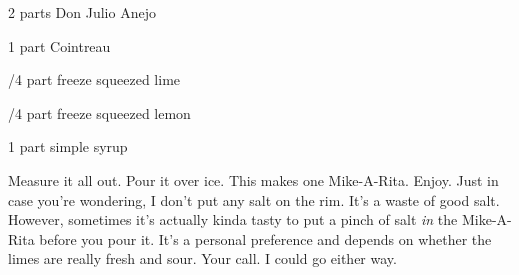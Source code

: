 %
%
%
%
\newpage



\begin{IngredientsAndSteps}
    \ListIngredientsAndSteps
    {
        2 parts Don Julio Anejo

        1 part Cointreau

        /4 part freeze squeezed lime

        /4 part freeze squeezed lemon

        1 part simple syrup
    }
    {
        Measure it all out. Pour it over ice. This makes one Mike-A-Rita. Enjoy. Just in case you're
        wondering, I don't put any salt on the rim. It's a waste of good salt. However, sometimes
        it's actually kinda tasty to put a pinch of salt \textit{in} the Mike-A-Rita before you
        pour it. It's a personal preference and depends on whether the limes are really fresh
        and sour. Your call. I could go either way.
    }
\end{IngredientsAndSteps}
